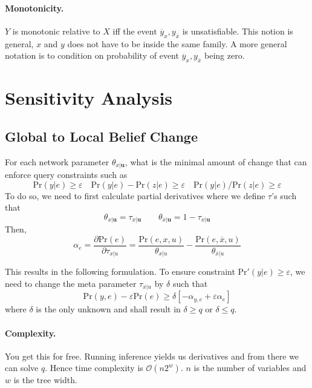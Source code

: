 \documentclass[11pt]{article}
\newcommand{\bu}{\mathbf{u}}
\newcommand{\pr}{\mathrm{Pr}}
\begin{document}
\paragraph{Monotonicity.} $Y$ is monotonic relative to $X$ iff the event $\overbar y _ x, y_{\overbar x}$ is unsatisfiable. This notion is general, $x$ and $y$ does not have to be inside the same family. A more general notation is to condition on probability of event $\overbar y _ x, y_{\overbar x}$ being zero. 

\section{Sensitivity Analysis}
\subsection{Global to Local Belief Change}
For each network parameter $\theta_{x | \bu}$, what is the minimal amount of change that can enforce query constraints such as 
\begin{equation}
	\pr (y | e) \geq \varepsilon \quad 
	\pr (y | e) - \pr(z | e ) \geq \varepsilon \quad 
	\pr (y | e) / \pr( z | e) \geq  \varepsilon
\end{equation}
To do so, we need to first calculate partial derivatives where we define $\tau$'s such that 
\begin{equation}
	\theta_{x|\bu} = \tau_{x | \bu} \quad \quad 
	\theta_{\overbar x |\bu} = 1 - \tau_{x | \bu}
\end{equation}
Then, 
\begin{equation}
	\alpha_e = \frac{\partial \pr(e)}{\partial \tau_{x | u}} = \frac{\pr(e, x, u)}{\theta_{x | u}} - \frac{\pr( e, \overbar x, u)}{\theta_{\overbar x | u}}
\end{equation}

This results in the following formulation. To ensure constraint $\pr'(y | e) \geq \varepsilon$, we need to change the meta parameter $\tau_{x |u}$ by $\delta$ such that 
\begin{equation}
	\pr(y, e) - \varepsilon\pr(e) \geq \delta[- \alpha _{y, e} + \varepsilon \alpha _e]
\end{equation}
where $\delta$ is the only unknown and shall result in $\delta \geq q$ or $\delta \leq q$. 

\paragraph{Complexity.} You get this for free. Running inference yields us derivatives and from there we can solve $q$. Hence time complexity is $\mathcal O (n 2^w)$. $n$ is the number of variables and $w$ is the tree width. 
\end{document}
